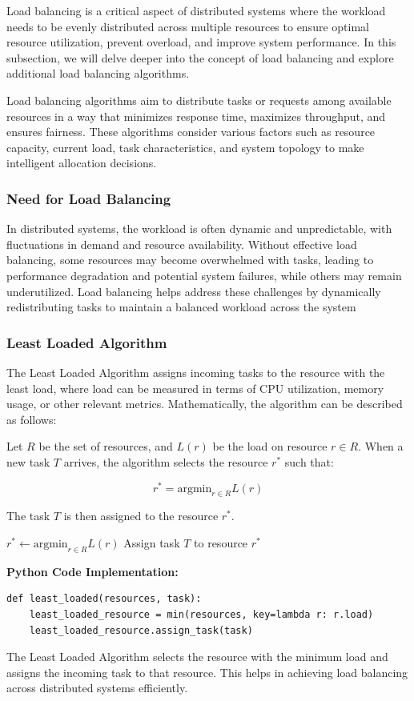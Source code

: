 \documentclass[12pt]{book} %
\begin{document}
Load balancing is a critical aspect of distributed systems where the workload needs to be evenly distributed across multiple resources to ensure optimal resource utilization, prevent overload, and improve system performance. In this subsection, we will delve deeper into the concept of load balancing and explore additional load balancing algorithms.

Load balancing algorithms aim to distribute tasks or requests among available resources in a way that minimizes response time, maximizes throughput, and ensures fairness. These algorithms consider various factors such as resource capacity, current load, task characteristics, and system topology to make intelligent allocation decisions.

\subsubsection{Need for Load Balancing}

In distributed systems, the workload is often dynamic and unpredictable, with fluctuations in demand and resource availability. Without effective load balancing, some resources may become overwhelmed with tasks, leading to performance degradation and potential system failures, while others may remain underutilized. Load balancing helps address these challenges by dynamically redistributing tasks to maintain a balanced workload across the system

\subsubsection{Least Loaded Algorithm}

The Least Loaded Algorithm assigns incoming tasks to the resource with the least load, where load can be measured in terms of CPU utilization, memory usage, or other relevant metrics. Mathematically, the algorithm can be described as follows:

Let $R$ be the set of resources, and $L(r)$ be the load on resource $r \in R$. When a new task $T$ arrives, the algorithm selects the resource $r^*$ such that:

$$r^* = \text{argmin}_{r \in R} L(r)$$

The task $T$ is then assigned to the resource $r^*$.
\FloatBarrier
\begin{algorithm}[H]
\caption{Least Loaded Algorithm}\label{alg:least_loaded}
\begin{algorithmic}[1]
\State $r^* \gets \text{argmin}_{r \in R} L(r)$
\State Assign task $T$ to resource $r^*$
\EndProcedure
\end{algorithmic}
\end{algorithm}
\FloatBarrier   
\textbf{Python Code Implementation:}
\FloatBarrier
\begin{lstlisting}
def least_loaded(resources, task):
    least_loaded_resource = min(resources, key=lambda r: r.load)
    least_loaded_resource.assign_task(task)
\end{lstlisting}
\FloatBarrier
The Least Loaded Algorithm selects the resource with the minimum load and assigns the incoming task to that resource. This helps in achieving load balancing across distributed systems efficiently.
\end{document}
